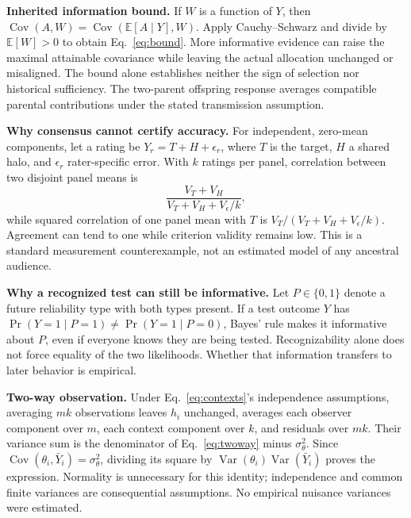 \documentclass[10pt,twocolumn,letterpaper]{article}
\newcommand{\E}{\mathbb{E}}
\newcommand{\Var}{\operatorname{Var}}
\newcommand{\Cov}{\operatorname{Cov}}
\begin{document}
\textbf{Inherited information bound.} If $W$ is a function of $Y$, then $\Cov(A,W)=\Cov(\E[A\mid Y],W)$. Apply Cauchy--Schwarz and divide by $\E[W]>0$ to obtain Eq.~\eqref{eq:bound}. More informative evidence can raise the maximal attainable covariance while leaving the actual allocation unchanged or misaligned. The bound alone establishes neither the sign of selection nor historical sufficiency. The two-parent offspring response averages compatible parental contributions under the stated transmission assumption.


\textbf{Why consensus cannot certify accuracy.} For independent, zero-mean components, let a rating be $Y_r=T+H+\epsilon_r$, where $T$ is the target, $H$ a shared halo, and $\epsilon_r$ rater-specific error. With $k$ ratings per panel, correlation between two disjoint panel means is
\begin{equation}
\frac{V_T+V_H}{V_T+V_H+V_\epsilon/k},
\end{equation}
while squared correlation of one panel mean with $T$ is $V_T/(V_T+V_H+V_\epsilon/k)$. Agreement can tend to one while criterion validity remains low. This is a standard measurement counterexample, not an estimated model of any ancestral audience.

\textbf{Why a recognized test can still be informative.} Let $P\in\{0,1\}$ denote a future reliability type with both types present. If a test outcome $Y$ has $\Pr(Y=1\mid P=1)\ne\Pr(Y=1\mid P=0)$, Bayes' rule makes it informative about $P$, even if everyone knows they are being tested. Recognizability alone does not force equality of the two likelihoods. Whether that information transfers to later behavior is empirical.

\textbf{Two-way observation.} Under Eq.~\eqref{eq:contexts}'s independence assumptions, averaging $mk$ observations leaves $h_i$ unchanged, averages each observer component over $m$, each context component over $k$, and residuals over $mk$. Their variance sum is the denominator of Eq.~\eqref{eq:twoway} minus $\sigma_\theta^2$. Since $\Cov(\theta_i,\bar Y_i)=\sigma_\theta^2$, dividing its square by $\Var(\theta_i)\Var(\bar Y_i)$ proves the expression. Normality is unnecessary for this identity; independence and common finite variances are consequential assumptions. No empirical nuisance variances were estimated.
\end{document}
